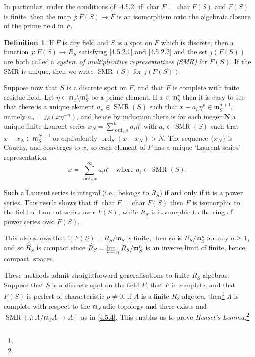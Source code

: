\documentclass[10pt,leqno]{article}
\theoremstyle{definition}
\newtheorem{defi}[theo]{Definition}
\def\NN{\mathbf{N}}
\def\mm{\mathfrak{m}}
\DeclareMathOperator{\chr}{char}
\DeclareMathOperator{\ord}{ord}
\def\qw#1{`#1'}
\def\fnfose{}
\def\fnfoei{}
\begin{document}
In particular, under the conditions of \ref{4.5.2} if $\chr F = \chr F(S)$ and $F(S)$ is finite, then the map $j : F(S) \to F$ is an isomorphism onto the algebraic closure of the prime field in $F$.


\begin{defi}
\label{4.5.3}
If $F$ is any field and $S$ is a spot on $F$ which is discrete, then a function $j : F(S) \to R_S$ satisfying \eqref{4.5.2.1} and \eqref{4.5.2.2} and the set $j(F(S))$ are both called a \emph{system of multiplicative representatives (SMR)} for $F(S)$.
If the SMR is unique, then we write $\operatorname{SMR}(S)$ for $j(F(S))$.
\end{defi}

Suppose now that $S$ is a discrete spot on $F$, and that $F$ is complete with finite residue field.
Let $\eta \in \mm_S \setminus \mm_S^2$ be a prime element.
If $x \in \mm_S^n$ then it is easy to see that there is a unique element $a_n \in \operatorname{SMR}(S)$ such that $x - a_n \eta^n \in \mm_S^{n+1}$, namely $a_n = j\rho(x\eta^{-n})$, and hence by induction there is for each ineger $\NN$ a unique finite Laurent series $x_N = \sum_{\ord_S x}^n a_i \eta^i$ with $a_i \in \operatorname{SMR}(S)$ such that $x - x_N \in \mm_S^{N+1}$ or equivalently $\ord_S(x - x_N) > N$.
The sequence $\{ x_N \}$ is Cauchy, and converges to $x$, so each element of $F$ has a unique \qw{Laurent series} representation
\begin{equation}
\label{4.5.4}
x = \sum_{\ord_S x}^\infty a_i \eta^i
\quad
\text{where $a_i \in \operatorname{SMR}(S)$.}
\end{equation}

Such a Laurent series is integral (i.e., belongs to $R_S$) if and only if it is a power series.
This result shows that if $\chr F = \chr F(S)$ then $F$ is isomorphic to the field of Laurent series over $F(S)$, while $R_S$ is isomorphic to the ring of power series over $F(S)$.

This also shows that if $F(S) = R_S / \mm_S$ is finite, then so is $R_S / \mm_S^n$ for any $n \geq 1$, and so $\widehat R_S$ is compact since $\widehat R_S = \varprojlim_n R_S / \mm_S^n$ is an inverse limit of finite, hence compact, spaces.

These methods admit straightforward generalisations to finite $R_S$-algebras.
Suppose that $S$ is a discrete spot on the field $F$, that $F$ is complete, and that $F(S)$ is perfect of characteristic $p \not= 0$.
If $A$ is a finite $R_S$-algebra, then\footnote{\fnfose} $A$ is complete with respect to the $\mm_S$-adic topology and there exists and $\operatorname{SMR}(j : A/\mm_S A \to A)$ as in \ref{4.5.4}.
This enables us to prove \emph{Hensel's Lemma}.\footnote{\fnfoei}
\end{document}
